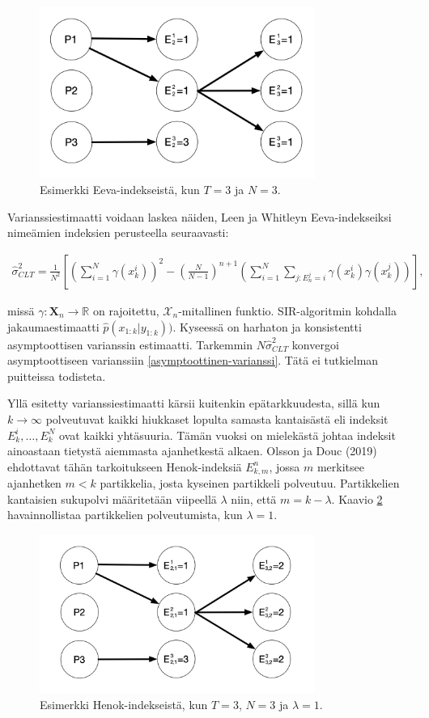 \documentclass[
  12pt,
  a4paper, twoside]{book}
\begin{document}
\begin{figure}[H]
\centering
\includegraphics[width=9cm]{eevaindeksit}
\caption{Esimerkki Eeva-indekseistä, kun $T=3$ ja $N=3$.}
\label{fig:eeva-indeksit}
\end{figure}

Varianssiestimaatti voidaan laskea näiden, Leen ja Whitleyn Eeva-indekseiksi nimeämien indeksien perusteella seuraavasti:

\begin{align}\label{CLT-varianssi}
\hat{\sigma}^2_{CLT} = \frac{1}{N^2} \left[ (\sum_{i=1}^N \gamma(x_k^i))^2 - (\frac{N}{N-1})^{n+1} ( \sum_{i=1}^N \sum_{j:E_n^j=i} \gamma(x_k^i) \gamma(x_k^j)) \right]
,\end{align}

missä \(\gamma: \mathbf{X}_n \rightarrow \mathbb{R}\) on rajoitettu, \(\mathcal{X}_n\)-mitallinen funktio. SIR-algoritmin kohdalla jakaumaestimaatti \(\hat{p}(x_{1:k}|y_{1:k}))\). Kyseessä on harhaton ja konsistentti asymptoottisen varianssin estimaatti. Tarkemmin \(N\hat{\sigma}^2_{CLT}\) konvergoi asymptoottiseen varianssiin \ref{asymptoottinen-varianssi}. Tätä ei tutkielman puitteissa todisteta.

Yllä esitetty varianssiestimaatti kärsii kuitenkin epätarkkuudesta, sillä kun \(k \to \infty\) polveutuvat kaikki hiukkaset lopulta samasta kantaisästä eli indeksit \(E_k^i,\ldots,E_k^N\) ovat kaikki yhtäsuuria. Tämän vuoksi on mielekästä johtaa indeksit ainoastaan tietystä aiemmasta ajanhetkestä alkaen. Olsson ja Douc (2019) \citep{olsson-2019} ehdottavat tähän tarkoitukseen Henok-indeksiä \(E_{k,m}^n\), jossa \(m\) merkitsee ajanhetken \(m<k\) partikkelia, josta kyseinen partikkeli polveutuu. Partikkelien kantaisien sukupolvi määritetään viipeellä \(\lambda\) niin, että \(m=k-\lambda\). Kaavio \ref{fig:henok-indeksit} havainnollistaa partikkelien polveutumista, kun \(\lambda=1\).

\begin{figure}[H]
\centering
\includegraphics[width=9cm]{henokindeksit}
\caption{Esimerkki Henok-indekseistä, kun $T=3$, $N=3$ ja $\lambda=1$.}
\label{fig:henok-indeksit}
\end{figure}
\end{document}
